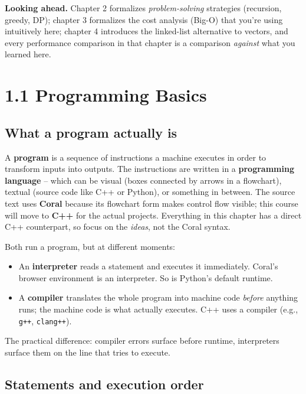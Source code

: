 \documentclass[11pt]{article}
\begin{document}
\begin{ideabox}
\textbf{Looking ahead.} Chapter 2 formalizes \emph{problem-solving}
strategies (recursion, greedy, DP); chapter 3 formalizes the cost analysis
(Big-O) that you're using intuitively here; chapter 4 introduces the
linked-list alternative to vectors, and every performance comparison in that
chapter is a comparison \emph{against} what you learned here.
\end{ideabox}

\section{1.1 Programming Basics}

\subsection{What a program actually is}

A \textbf{program} is a sequence of instructions a machine executes in order
to transform inputs into outputs. The instructions are written in a
\textbf{programming language} -- which can be visual (boxes connected by
arrows in a flowchart), textual (source code like C++ or Python), or
something in between. The source text uses \textbf{Coral} because its
flowchart form makes control flow visible; this course will move to
\textbf{C++} for the actual projects. Everything in this chapter has a
direct C++ counterpart, so focus on the \emph{ideas}, not the Coral syntax.

\begin{defnbox}
Both run a program, but at different moments:
\begin{itemize}
    \item An \textbf{interpreter} reads a statement and executes it
          immediately. Coral's browser environment is an interpreter. So is
          Python's default runtime.
    \item A \textbf{compiler} translates the whole program into machine code
          \emph{before} anything runs; the machine code is what actually
          executes. C++ uses a compiler (e.g., \texttt{g++}, \texttt{clang++}).
\end{itemize}
The practical difference: compiler errors surface before runtime,
interpreters surface them on the line that tries to execute.
\end{defnbox}

\subsection{Statements and execution order}
\end{document}
